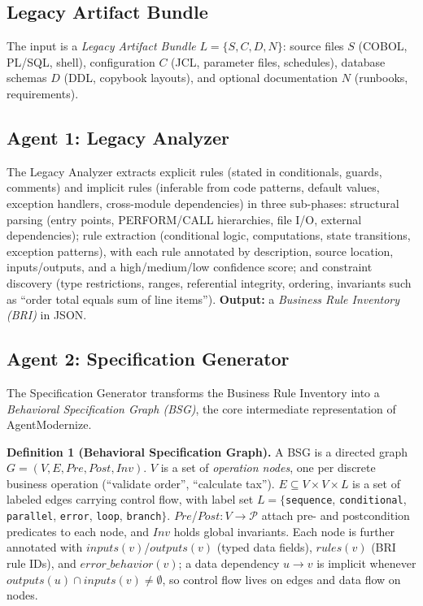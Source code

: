 \documentclass[conference]{IEEEtran}
\begin{document}
\subsection{Legacy Artifact Bundle}

The input is a \textit{Legacy Artifact Bundle} $L = \{S, C, D, N\}$: source files $S$ (COBOL, PL/SQL, shell), configuration $C$ (JCL, parameter files, schedules), database schemas $D$ (DDL, copybook layouts), and optional documentation $N$ (runbooks, requirements).

\subsection{Agent 1: Legacy Analyzer}

The Legacy Analyzer extracts explicit rules (stated in conditionals, guards, comments) and implicit rules (inferable from code patterns, default values, exception handlers, cross-module dependencies) in three sub-phases: structural parsing (entry points, PERFORM/CALL hierarchies, file I/O, external dependencies); rule extraction (conditional logic, computations, state transitions, exception patterns), with each rule annotated by description, source location, inputs/outputs, and a high/medium/low confidence score; and constraint discovery (type restrictions, ranges, referential integrity, ordering, invariants such as ``order total equals sum of line items''). \textbf{Output:} a \textit{Business Rule Inventory (BRI)} in JSON.

\subsection{Agent 2: Specification Generator}

The Specification Generator transforms the Business Rule Inventory into a \textit{Behavioral Specification Graph (BSG)}, the core intermediate representation of AgentModernize.

\textbf{Definition 1 (Behavioral Specification Graph).} A BSG is a directed graph $G = (V, E, Pre, Post, Inv)$. $V$ is a set of \textit{operation nodes}, one per discrete business operation (``validate order'', ``calculate tax''). $E \subseteq V \times V \times L$ is a set of labeled edges carrying control flow, with label set $L = \{$\texttt{sequence}, \texttt{conditional}, \texttt{parallel}, \texttt{error}, \texttt{loop}, \texttt{branch}$\}$. $Pre$/$Post: V \rightarrow \mathcal{P}$ attach pre- and postcondition predicates to each node, and $Inv$ holds global invariants. Each node is further annotated with $inputs(v)$/$outputs(v)$ (typed data fields), $rules(v)$ (BRI rule IDs), and $error\_behavior(v)$; a data dependency $u \rightarrow v$ is implicit whenever $outputs(u) \cap inputs(v) \neq \emptyset$, so control flow lives on edges and data flow on nodes.
\end{document}
